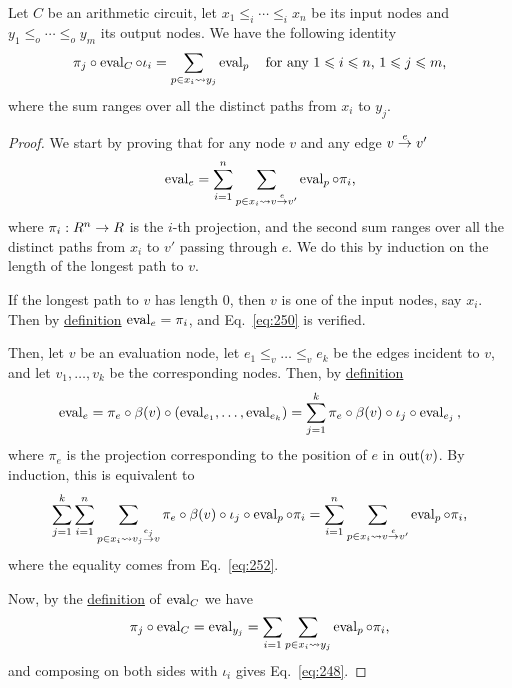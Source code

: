 \begin{lemma}
  \label{th:electrical-network}
  Let $C$ be an arithmetic circuit, let $x_1\le_i\cdots\le_ix_n$ be
  its input nodes and $y_1\le_o\cdots\le_oy_m$ its output nodes. 
  We have the following identity
  \begin{equation}
    \label{eq:248}
    \pi_j\circ\operatorname{eval}_C\circ\iota_i =
    \sum_{p\in x_i\leadsto y_j}\operatorname{eval}_p
    \quad\text{for any $1\leqslant i\leqslant n$, $1\leqslant j\leqslant m$,}
  \end{equation}
  where the sum ranges over all the distinct paths from $x_i$ to
  $y_j$.
\end{lemma}
\begin{proof}
  We start by proving that for any node $v$ and any edge
  $v\overset{e}{\rightarrow}v'$
  \begin{equation}
    \label{eq:250}
    \operatorname{eval}_{e} = \sum_{i=1}^n\sum_{p\in x_i\leadsto v\overset{e}{\rightarrow}v'}\operatorname{eval}_p\circ\pi_i
    \text{,}
  \end{equation}
  where $\pi_i:R^n\rightarrow R$ is the $i$-th projection, and the second sum
  ranges over all the distinct paths from $x_i$ to $v'$ passing
  through $e$. We do this by induction on the length of the longest
  path to $v$.

  If the longest path to $v$ has length $0$, then $v$ is one of the
  input nodes, say $x_i$. Then by \hyperref[def:eval]{definition}
  $\operatorname{eval}_e=\pi_i$, and Eq.~\eqref{eq:250} is verified.

  Then, let $v$ be an evaluation node, let $e_1\le_v\ldots\le_ve_k$ be
  the edges incident to $v$, and let $v_1,\ldots,v_k$ be the
  corresponding nodes. Then, by \hyperref[def:eval]{definition}
  \begin{equation}
    \label{eq:251}
    \operatorname{eval}_{e} = \pi_e\circ\beta(v)\circ(\operatorname{eval}_{e_1},\ldots,\operatorname{eval}_{e_k}) =
    \sum_{j=1}^k \pi_e\circ\beta(v)\circ\iota_j\circ\operatorname{eval}_{e_j}
    \text{,}
  \end{equation}
  where $\pi_e$ is the projection corresponding to the position of $e$
  in $\operatorname{out}(v)$. By induction, this is equivalent to
  \begin{equation}
    \label{eq:253}
    \sum_{j=1}^k\sum_{i=1}^n\sum_{p\in x_i\leadsto v_j\overset{e_j}{\rightarrow}v} \pi_e\circ\beta(v)\circ\iota_j\circ\operatorname{eval}_p\circ\pi_i =
    \sum_{i=1}^n\sum_{p\in x_i\leadsto v\overset{e}{\rightarrow}v'}\operatorname{eval}_p\circ\pi_i
    \text{,}
  \end{equation}
  where the equality comes from Eq.~\eqref{eq:252}.

  Now, by the \hyperref[def:eval]{definition} of $\operatorname{eval}_C$ we have
  \begin{equation}
    \label{eq:254}
    \pi_j\circ\operatorname{eval}_C = \operatorname{eval}_{y_j} = \sum_{i=1}\sum_{p\in x_i\leadsto y_j}\operatorname{eval}_p\circ\pi_i
    \text{,}
  \end{equation}
  and composing on both sides with $\iota_i$ gives Eq.~\eqref{eq:248}.
\end{proof}


